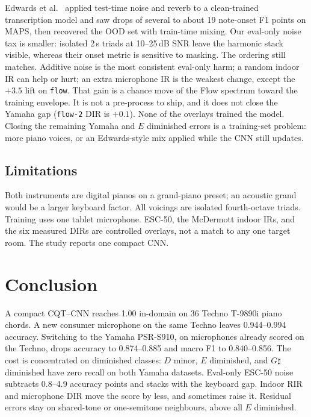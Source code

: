 \documentclass[pdflatex,sn-mathphys-num,iicol]{sn-jnl}
\theoremstyle{thmstyleone}
\theoremstyle{thmstyletwo}
\theoremstyle{thmstylethree}
\begin{document}
Edwards et al.\ \cite{Edwards2024} applied test-time noise and reverb to a clean-trained transcription model and saw drops of several to about 19 note-onset F1 points on MAPS, then recovered the OOD set with train-time mixing. Our eval-only noise tax is smaller: isolated 2\,s triads at 10--25\,dB SNR leave the harmonic stack visible, whereas their onset metric is sensitive to masking. The ordering still matches. Additive noise is the most consistent eval-only harm; a random indoor IR can help or hurt; an extra microphone IR is the weakest change, except the $+3.5$ lift on \texttt{flow}. That gain is a chance move of the Flow spectrum toward the training envelope. It is not a pre-process to ship, and it does not close the Yamaha gap (\texttt{flow-2} DIR is $+0.1$). None of the overlays trained the model. Closing the remaining Yamaha and $E$ diminished errors is a training-set problem: more piano voices, or an Edwards-style mix applied while the CNN still updates.

\subsection{Limitations}\label{subsec5_3}

Both instruments are digital pianos on a grand-piano preset; an acoustic grand would be a larger keyboard factor. All voicings are isolated fourth-octave triads. Training uses one tablet microphone. ESC-50, the McDermott indoor IRs, and the six measured DIRs are controlled overlays, not a match to any one target room. The study reports one compact CNN.

\section{Conclusion}\label{sec6}

A compact CQT--CNN reaches 1.00 in-domain on 36 Techno T-9890i piano chords. A new consumer microphone on the same Techno leaves 0.944--0.994 accuracy. Switching to the Yamaha PSR-S910, on microphones already scored on the Techno, drops accuracy to 0.874--0.885 and macro F1 to 0.840--0.856. The cost is concentrated on diminished classes: $D$ minor, $E$ diminished, and $G\sharp$ diminished have zero recall on both Yamaha datasets. Eval-only ESC-50 noise subtracts 0.8--4.9 accuracy points and stacks with the keyboard gap. Indoor RIR and microphone DIR move the score by less, and sometimes raise it. Residual errors stay on shared-tone or one-semitone neighbours, above all $E$ diminished.
\end{document}
